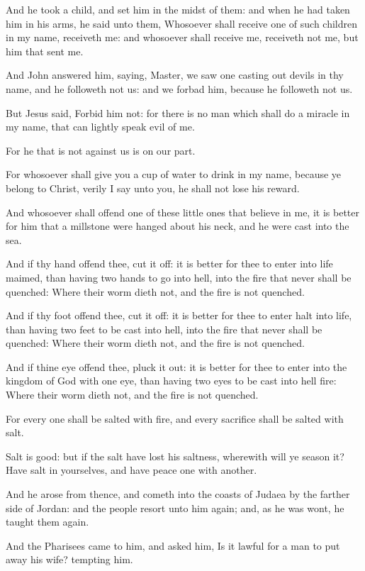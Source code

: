 \Verse And he took a child, and set him in the midst of them: and when he had taken him in his arms, he said unto them, \Verse Whosoever shall receive one of such children in my name, receiveth me: and whosoever shall receive me, receiveth not me, but him that sent me.

\Verse And John answered him, saying, Master, we saw one casting out devils in thy name, and he followeth not us: and we forbad him, because he followeth not us.

\Verse But Jesus said, Forbid him not: for there is no man which shall do a miracle in my name, that can lightly speak evil of me.

\Verse For he that is not against us is on our part.

\Verse For whosoever shall give you a cup of water to drink in my name, because ye belong to Christ, verily I say unto you, he shall not lose his reward.

\Verse And whosoever shall offend one of these little ones that believe in me, it is better for him that a millstone were hanged about his neck, and he were cast into the sea.

\Verse And if thy hand offend thee, cut it off: it is better for thee to enter into life maimed, than having two hands to go into hell, into the fire that never shall be quenched: \Verse Where their worm dieth not, and the fire is not quenched.

\Verse And if thy foot offend thee, cut it off: it is better for thee to enter halt into life, than having two feet to be cast into hell, into the fire that never shall be quenched: \Verse Where their worm dieth not, and the fire is not quenched.

\Verse And if thine eye offend thee, pluck it out: it is better for thee to enter into the kingdom of God with one eye, than having two eyes to be cast into hell fire: \Verse Where their worm dieth not, and the fire is not quenched.

\Verse For every one shall be salted with fire, and every sacrifice shall be salted with salt.

\Verse Salt is good: but if the salt have lost his saltness, wherewith will ye season it? Have salt in yourselves, and have peace one with another.


\Chapter
\Verse And he arose from thence, and cometh into the coasts of Judaea by the farther side of Jordan: and the people resort unto him again; and, as he was wont, he taught them again.

\Verse And the Pharisees came to him, and asked him, Is it lawful for a man to put away his wife? tempting him.

